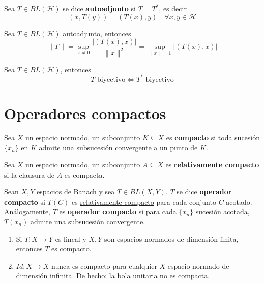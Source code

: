 \documentclass[12pt]{book}
\newcommand{\tbf}{\textbf}
\begin{document}
\begin{definicion}
    Sea $T \in BL(\mathcal{H})$ se dice \textbf{autoadjunto} si $T = T^*$, es decir
    \[ (x, T(y)) = (T(x), y) \quad \forall x, y \in \mathcal{H} \]
\end{definicion}

\begin{teo}
    Sea $T \in BL(\mathcal{H})$ autoadjunto, entonces 
    \begin{equation*}
        \|T\| = \sup_{x \neq 0} \frac{|(T(x), x)|}{\|x\|^2} = \sup_{\|x\|=1} |(T(x), x)|
    \end{equation*}
\end{teo}

\begin{prop}
    Sea $T\in BL(\mathcal{H})$, entonces 
    \begin{equation*}
        T \text{ biyectivo} \iff T^* \text{ biyectivo}
    \end{equation*} 
\end{prop}

\section{Operadores compactos}

\begin{definicion}
    Sea $X$ un espacio normado, un subconjunto $K \subseteq X$ es \textbf{compacto} si toda sucesión $\{x_n\}$ en $K$ admite una subsucesión convergente a un punto de $K$. \\
\end{definicion}

\begin{definicion}
    Sea $X$ un espacio normado, un subconjunto $A \subseteq X$ es \textbf{relativamente compacto} si la clausura de $A$ es compacta. \\
\end{definicion}

\begin{definicion}
    Sean $X, Y$ espacios de Banach y sea $T\in BL(X,Y)$. $T$ se dice \textbf{operador compacto} si $T(C)$ es \underline{relativamente compacto} para cada conjunto $C$ acotado. \\
    \noindent
    Análogamente, $T$ es \tbf{operador compacto} si para cada $\{x_n\}$ sucesión acotada, $T(x_n)$ admite una subsucesión convergente. \\
\end{definicion}

\begin{ejemplo}
    \begin{enumerate}
        \item Si $T: X \to Y$ es lineal y $X, Y$ son espacios normados de dimensión finita, entonces $T$ es compacto.
        \item $Id: X \to X$ nunca es compacto para cualquier $X$ espacio normado de dimensión infinita. De hecho: la bola unitaria no es compacta.
    \end{enumerate}
\end{ejemplo}
\end{document}
